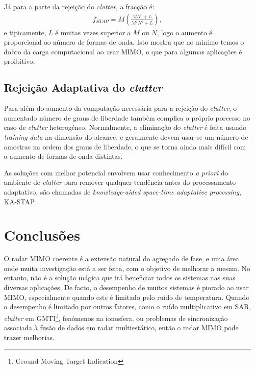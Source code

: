 \documentclass[purist,portuguese]{ist-report}
\begin{document}
Já para a parte da rejeição do \textit{clutter}, a fracção é:
\begin{align}
  f_{STAP} = M\left( \frac{MN^3+L}{M^2N^2+L} \right),
  \label{eq:ops_cl}
\end{align}
e tipicamente, $L$ é muitas vezes superior a $M$ ou $N$, logo o aumento é proporcional ao número de formas de onda.
Isto mostra que no mínimo temos o dobro da carga computacional ao usar MIMO, o que para algumas aplicações é proibitivo. 

\subsection{Rejeição Adaptativa do \textit{clutter}}

Para além do aumento da computação necessária para a rejeição do \textit{clutter}, o aumentado número de graus de liberdade também complica o próprio porcesso no caso de \textit{clutter} heterogéneo. 
Normalmente, a eliminação do \textit{clutter} é feita usando \textit{training data} na dimensão do alcance, e geralmente devem usar-se um número de amostras na ordem dos graus de liberdade, o que se torna ainda mais difícil com o aumento de formas de onda distintas.

As soluções com melhor potencial envolvem usar conhecimento \emph{a priori} do ambiente de \textit{clutter} para remover qualquer tendência antes do processamento adaptativo, são chamadas de \textit{knowledge-aided space-time adaptative processing}, KA-STAP.

\section{Conclusões}

O radar MIMO coerente é a extensão natural do agregado de fase, e uma área onde muita investigação está a ser feita, com o objetivo de melhorar a mesma.
No entanto, não é a solução mágica que irá beneficiar todos os sistemas nas suas diversas aplicações. De facto, o desempenho de muitos sistemas é piorado ao usar MIMO, especialmente quando este é limitado pelo ruído de temperatura.
Quando o desempenho é limitado por outros fatores, como o ruído multiplicativo em SAR, \textit{clutter} em GMTI\footnote{Ground Moving Target Indication}, fenómenos na ionosfera, ou problemas de sincronização associada à fusão de dados em radar multiestático, então o radar MIMO pode trazer melhorias.






\nocite{radarhandbook,radarsystems,davis2015mimo,li2018mimo,radartutorial,sturm2013spectrally,chen2008mimo,nrcan,mimoradarbook}
\printbibliography

\listoftodos
\end{document}
